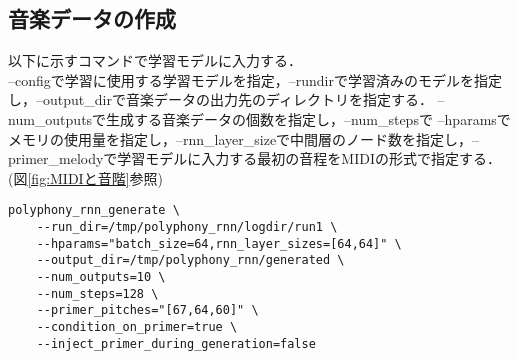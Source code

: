 \subsection{音楽データの作成}
以下に示すコマンドで学習モデルに入力する．\\
--configで学習に使用する学習モデルを指定，--rundirで学習済みのモデルを指定し，--output\_dirで音楽データの出力先のディレクトリを指定する．
--num\_outputsで生成する音楽データの個数を指定し，--num\_stepsで
--hparamsでメモリの使用量を指定し，--rnn\_layer\_sizeで中間層のノード数を指定し，--primer\_melodyで学習モデルに入力する最初の音程をMIDIの形式で指定する．(図\ref{fig:MIDIと音階}参照)\\
\begin{lstlisting}[basicstyle=\ttfamily\footnotesize,frame=single]
    polyphony_rnn_generate \
    --run_dir=/tmp/polyphony_rnn/logdir/run1 \
    --hparams="batch_size=64,rnn_layer_sizes=[64,64]" \
    --output_dir=/tmp/polyphony_rnn/generated \
    --num_outputs=10 \
    --num_steps=128 \
    --primer_pitches="[67,64,60]" \
    --condition_on_primer=true \
    --inject_primer_during_generation=false
\end{lstlisting}